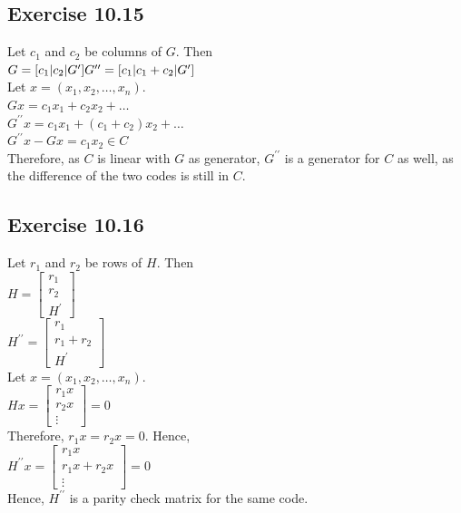\documentclass[a4paper,12pt]{article}
\begin{document}
\subsection*{Exercise 10.15}
Let $c_1$ and $c_2$ be columns of $G$. Then\\
$G=[c_1|c_2|G^\prime]\\
G^{\prime\prime}=[c_1|c_1+c_2|G^\prime]$\\
Let $x=(x_1,x_2,\ldots, x_n)$.\\
$Gx=c_1x_1+c_2x_2+\ldots$\\
$G^{\prime\prime}x=c_1x_1+(c_1+c_2)x_2+\ldots$\\
$G^{\prime\prime}x-Gx=c_1x_2\in C$\\
Therefore, as $C$ is linear with $G$ as generator, $G^{\prime\prime}$ is a generator for
$C$ as well, as the difference of the two codes is still in $C$.  
\subsection*{Exercise 10.16}
Let $r_1$ and $r_2$ be rows of $H$. Then\\
$H=\left[\begin{array}{c}
    r_1 \\ \hline
    r_2 \\ \hline
    H^\prime
    \end{array}\right]$\\
$H^{\prime\prime}=\left[\begin{array}{c}
    r_1 \\ \hline
    r_1+r_2 \\ \hline
    H^\prime
    \end{array}\right]$\\
Let $x=(x_1,x_2,\ldots, x_n)$.\\
$Hx=\begin{bmatrix}
    r_1x\\
    r_2x\\
    \vdots
\end{bmatrix}=0$\\
Therefore, $r_1x=r_2x=0$. Hence,\\
$H^{\prime\prime}x=\begin{bmatrix}
    r_1x\\
    r_1x+r_2x\\
    \vdots
\end{bmatrix}=0$\\
Hence, $H^{\prime\prime}$ is a parity check matrix for the same code.
\end{document}
